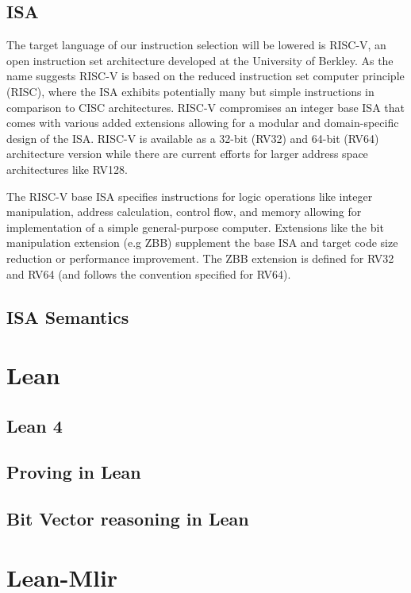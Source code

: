 \subsection{ ISA}
The target language of our instruction selection will be lowered  is RISC-V, an open instruction set architecture developed at the University of Berkley. As the name suggests RISC-V is based on the reduced instruction set computer principle (RISC), where the ISA exhibits potentially many but simple instructions in comparison to CISC architectures.  RISC-V compromises an integer base ISA that comes with various added extensions allowing for a modular and domain-specific design of the ISA. RISC-V is available as a 32-bit (RV32) and 64-bit (RV64) architecture version while there are current efforts for  larger address space architectures like  RV128. 

The RISC-V base ISA specifies instructions for logic operations like integer manipulation, address calculation, control flow, and memory allowing for implementation of a simple general-purpose computer. Extensions like the bit manipulation extension (e.g ZBB)  supplement the base ISA and target code size reduction or performance improvement. The ZBB extension is defined for RV32 and RV64 (and follows the convention specified for RV64).
\subsection{ ISA Semantics}
\section {Lean}
\subsection{ Lean 4 }
\subsection{ Proving in Lean }
\subsection{ Bit Vector reasoning in Lean }
\section {Lean-Mlir}